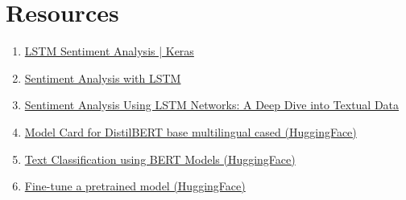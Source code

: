 \documentclass[11pt]{article}
\begin{document}
\section{Resources}
\begin{enumerate}
    \item \href{https://www.kaggle.com/code/ngyptr/lstm-sentiment-analysis-keras}{LSTM Sentiment Analysis | Keras}

    \item \href{https://www.analyticsvidhya.com/blog/2022/01/sentiment-analysis-with-lstm/}{Sentiment Analysis with LSTM}

    \item \href{https://javilopezcastillo.medium.com/sentiment-analysis-using-lstm-networks-a-deep-dive-into-textual-data-61cdd2e43dec}{Sentiment Analysis Using LSTM Networks: A Deep Dive into Textual Data}

    \item \href{https://huggingface.co/distilbert/distilbert-base-multilingual-cased#training-details}{Model Card for DistilBERT base multilingual cased (HuggingFace)}

    \item \href{https://huggingface.co/docs/transformers/tasks/sequence_classification}{Text Classification using BERT Models (HuggingFace)}

    \item \href{https://huggingface.co/docs/transformers/training}{Fine-tune a pretrained model (HuggingFace)}

    
\end{enumerate}
\end{document}
